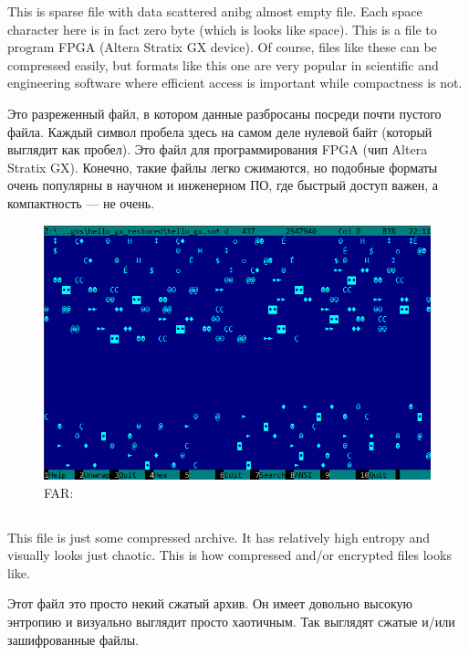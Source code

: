 \ifdefined\ENGLISH
This is sparse file with data scattered anibg almost empty file.
Each space character here is in fact zero byte (which is looks like space).
This is a file to program FPGA (Altera Stratix GX device).
Of course, files like these can be compressed easily, but formats like this one are very popular in scientific and engineering software where efficient access is important while compactness is not.
\fi %

\ifdefined\RUSSIAN
Это разреженный файл, в котором данные разбросаны посреди почти пустого файла.
Каждый символ пробела здесь на самом деле нулевой байт (который выглядит как пробел).
Это файл для программирования FPGA (чип Altera Stratix GX).
Конечно, такие файлы легко сжимаются, но подобные форматы очень популярны в научном и инженерном ПО, где быстрый доступ важен, а компактность --- не очень.
\fi %

\begin{figure}[H]
\centering
\includegraphics[scale=\NormalScale]{digging_into_code/binary/sparse_FPGA.png}
\caption{FAR: }
\end{figure}

\clearpage
\subsection{}

\ifdefined\ENGLISH
This file is just some compressed archive.
It has relatively high entropy and visually looks just chaotic.
This is how compressed and/or encrypted files looks like.
\fi %

\ifdefined\RUSSIAN
Этот файл это просто некий сжатый архив.
Он имеет довольно высокую энтропию и визуально выглядит просто хаотичным.
Так выглядят сжатые и/или зашифрованные файлы.
\fi %

